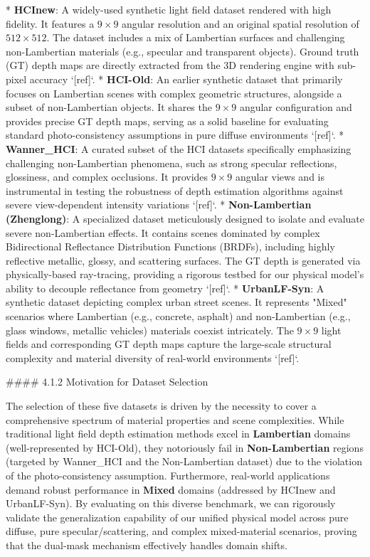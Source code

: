 \documentclass[journal]{IEEEtran}
\begin{document}
*   \textbf{HCInew}: A widely-used synthetic light field dataset rendered with high fidelity. It features a \(9 \times 9\) angular resolution and an original spatial resolution of \(512 \times 512\). The dataset includes a mix of Lambertian surfaces and challenging non-Lambertian materials (e.g., specular and transparent objects). Ground truth (GT) depth maps are directly extracted from the 3D rendering engine with sub-pixel accuracy `[ref]`.
*   \textbf{HCI-Old}: An earlier synthetic dataset that primarily focuses on Lambertian scenes with complex geometric structures, alongside a subset of non-Lambertian objects. It shares the \(9 \times 9\) angular configuration and provides precise GT depth maps, serving as a solid baseline for evaluating standard photo-consistency assumptions in pure diffuse environments `[ref]`.
*   \textbf{Wanner_HCI}: A curated subset of the HCI datasets specifically emphasizing challenging non-Lambertian phenomena, such as strong specular reflections, glossiness, and complex occlusions. It provides \(9 \times 9\) angular views and is instrumental in testing the robustness of depth estimation algorithms against severe view-dependent intensity variations `[ref]`.
*   \textbf{Non-Lambertian (Zhenglong)}: A specialized dataset meticulously designed to isolate and evaluate severe non-Lambertian effects. It contains scenes dominated by complex Bidirectional Reflectance Distribution Functions (BRDFs), including highly reflective metallic, glossy, and scattering surfaces. The GT depth is generated via physically-based ray-tracing, providing a rigorous testbed for our physical model's ability to decouple reflectance from geometry `[ref]`.
*   \textbf{UrbanLF-Syn}: A synthetic dataset depicting complex urban street scenes. It represents "Mixed" scenarios where Lambertian (e.g., concrete, asphalt) and non-Lambertian (e.g., glass windows, metallic vehicles) materials coexist intricately. The \(9 \times 9\) light fields and corresponding GT depth maps capture the large-scale structural complexity and material diversity of real-world environments `[ref]`.

\#\#\#\# 4.1.2 Motivation for Dataset Selection

The selection of these five datasets is driven by the necessity to cover a comprehensive spectrum of material properties and scene complexities. While traditional light field depth estimation methods excel in \textbf{Lambertian} domains (well-represented by HCI-Old), they notoriously fail in \textbf{Non-Lambertian} regions (targeted by Wanner_HCI and the Non-Lambertian dataset) due to the violation of the photo-consistency assumption. Furthermore, real-world applications demand robust performance in \textbf{Mixed} domains (addressed by HCInew and UrbanLF-Syn). By evaluating on this diverse benchmark, we can rigorously validate the generalization capability of our unified physical model across pure diffuse, pure specular/scattering, and complex mixed-material scenarios, proving that the dual-mask mechanism effectively handles domain shifts.
\end{document}
